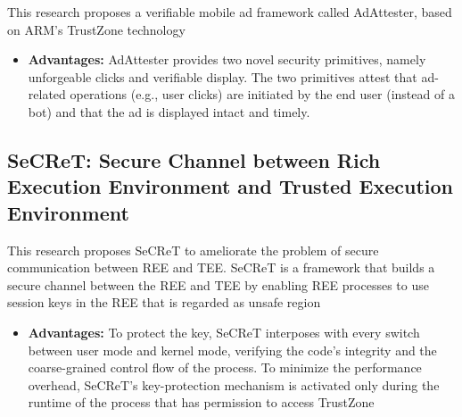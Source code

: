 \documentclass[conference]{IEEEtran}
\begin{document}
\cite{misc8} This research proposes a verifiable mobile ad framework called AdAttester, based on ARM’s TrustZone technology
\begin{itemize}
    \item \textbf{Advantages:} AdAttester provides two novel security primitives, namely unforgeable clicks and verifiable display. The two primitives attest that ad-related operations (e.g., user clicks) are initiated by the end user (instead of a bot) and that the ad is displayed intact and timely.
\end{itemize}


\subsection{SeCReT: Secure Channel between Rich Execution Environment and Trusted Execution Environment}

\cite{misc9} This research proposes SeCReT to ameliorate the problem of secure communication between REE and TEE. SeCReT is a framework that builds a secure channel between the REE and TEE by enabling REE processes to use session keys in the REE that is regarded as unsafe region
\begin{itemize}
    \item \textbf{Advantages:} To protect the key, SeCReT interposes with every switch between user mode and kernel mode, verifying the code’s integrity and the coarse-grained control flow of the process. To minimize the performance overhead, SeCReT’s key-protection mechanism is activated only during the runtime of the process that has permission to access TrustZone
\end{itemize}



\end{document}
